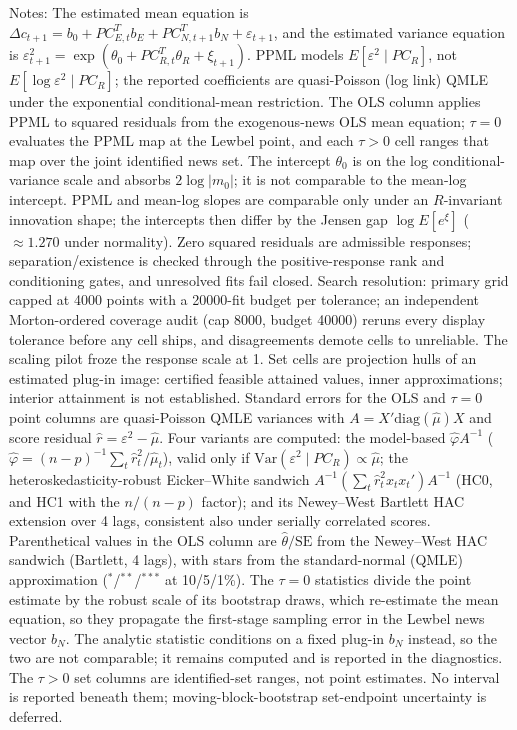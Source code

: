 \begin{table}[!htbp]
\begin{threeparttable}
\begin{tablenotes}[flushleft]
\item Notes: The estimated mean equation is $\Delta c_{t+1}=b_{0}+PC_{E,t}^{T}b_{E}+ PC_{N,t+1}^{T}b_{N}+\varepsilon_{t+1}$, and the estimated variance equation is $\varepsilon_{t+1}^{2}= \exp(\theta_{0}+PC_{R,t}^{T}\theta_{R}+\xi_{t+1})$. PPML models $E[\varepsilon^2 \mid PC_R]$, not $E[\log \varepsilon^2 \mid PC_R]$; the reported coefficients are quasi-Poisson (log link) QMLE under the exponential conditional-mean restriction. The OLS column applies PPML to squared residuals from the exogenous-news OLS mean equation; $\tau{=}0$ evaluates the PPML map at the Lewbel point, and each $\tau{>}0$ cell ranges that map over the joint identified news set. The intercept $\theta_0$ is on the log conditional-variance scale and absorbs $2\log|m_0|$; it is not comparable to the mean-log intercept. PPML and mean-log slopes are comparable only under an $R$-invariant innovation shape; the intercepts then differ by the Jensen gap $\log E[e^{\xi}]$ ($\approx 1.270$ under normality). Zero squared residuals are admissible responses; separation/existence is checked through the positive-response rank and conditioning gates, and unresolved fits fail closed. Search resolution: primary grid capped at 4000 points with a 20000-fit budget per tolerance; an independent Morton-ordered coverage audit (cap 8000, budget 40000) reruns every display tolerance before any cell ships, and disagreements demote cells to unreliable. The scaling pilot froze the response scale at 1. Set cells are projection hulls of an estimated plug-in image: certified feasible attained values, inner approximations; interior attainment is not established. Standard errors for the OLS and $\tau{=}0$ point columns are quasi-Poisson QMLE variances with $A = X'\mathrm{diag}(\hat\mu)X$ and score residual $\hat r = \varepsilon^2 - \hat\mu$. Four variants are computed: the model-based $\hat\varphi A^{-1}$ ($\hat\varphi = (n{-}p)^{-1}\sum_t \hat r_t^2/\hat\mu_t$), valid only if $\mathrm{Var}(\varepsilon^2 \mid PC_R) \propto \hat\mu$; the heteroskedasticity-robust Eicker--White sandwich $A^{-1}(\sum_t \hat r_t^2 x_t x_t')A^{-1}$ (HC0, and HC1 with the $n/(n{-}p)$ factor); and its Newey--West Bartlett HAC extension over 4 lags, consistent also under serially correlated scores. Parenthetical values in the OLS column are $\hat\theta/\mathrm{SE}$ from the Newey--West HAC sandwich (Bartlett, 4 lags), with stars from the standard-normal (QMLE) approximation ($^{*}$/$^{**}$/$^{***}$ at 10/5/1\%). The $\tau{=}0$ statistics divide the point estimate by the robust scale of its bootstrap draws, which re-estimate the mean equation, so they propagate the first-stage sampling error in the Lewbel news vector $b_N$. The analytic statistic conditions on a fixed plug-in $b_N$ instead, so the two are not comparable; it remains computed and is reported in the diagnostics. The $\tau{>}0$ set columns are identified-set ranges, not point estimates. No interval is reported beneath them; moving-block-bootstrap set-endpoint uncertainty is deferred.
\end{tablenotes}
\end{threeparttable}
\end{table}
